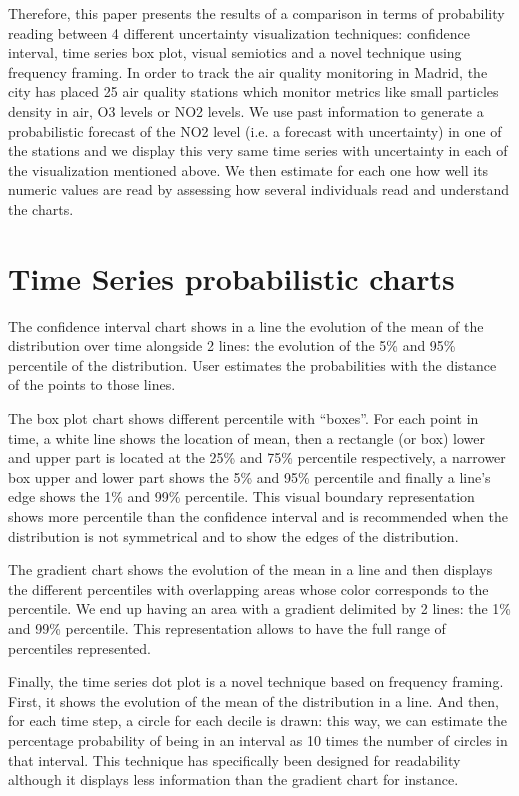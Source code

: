 \documentclass[a4paper,3p,sort&compress]{elsarticle}
\begin{document}
Therefore, this paper presents the results of a comparison in terms of probability reading between 4 different 
uncertainty visualization techniques: confidence interval, time series box plot, visual semiotics and a 
novel technique using frequency framing.
In order to track the air quality monitoring in Madrid, the city has placed 25 air quality stations which monitor 
metrics like small particles density in air, O3 levels or NO2 levels. We use past information 
to generate a probabilistic forecast of the NO2 level (i.e. a forecast with uncertainty) in one of the 
stations and we display this very same time series with uncertainty in each of the visualization mentioned above. 
We then estimate for each one how well its numeric values are read by assessing how several individuals read 
and understand the charts.

\section{Time Series probabilistic charts} 
\label{sec:time_series}

The confidence interval chart shows in a line the evolution of the mean of the distribution
 over time alongside 2 lines: the evolution of the 5\% and 95\% percentile of the distribution. 
 User estimates the probabilities with the distance of the points to those lines.

The box plot chart shows different percentile with “boxes”. For each point in time, a white 
line shows the location of mean, then a rectangle (or box) lower and upper part is located 
at the 25\% and 75\% percentile respectively, a narrower box upper and lower part shows 
the 5\% and 95\% percentile and finally a line’s edge shows the 1\% and 99\% percentile. 
This visual boundary representation shows more percentile than the confidence interval and 
is recommended when the distribution is not symmetrical and to show the edges of the distribution.

The gradient chart shows the evolution of the mean in a line and then displays the different percentiles
with overlapping areas whose color corresponds to the percentile. We end up having an area with a gradient 
delimited by 2 lines: the 1\% and 99\% percentile. This representation allows to have the
 full range of percentiles represented.

Finally, the time series dot plot is a novel technique based on frequency framing. First, 
it shows the evolution of the mean of the distribution in a line. And then, for each time 
step, a circle for each decile is drawn: this way, we can estimate the percentage 
probability of being in an interval as 10 times the number of circles in that interval. 
This technique has 
specifically been designed for readability although it displays less information than 
the gradient chart for instance.
\end{document}
